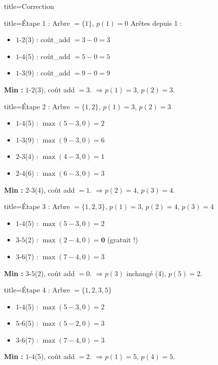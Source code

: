\documentclass[12pt,a4paper]{article}
\begin{document}
\begin{correction}{title=Correction}

\begin{etape}{title=\'Etape 1 : Arbre $= \{1\}$, $p(1)=0$}
Ar\^etes depuis 1 :
\begin{itemize}[nosep]
    \item $1$-$2$(3) : co\^ut\_add $= 3-0 = 3$
    \item $1$-$4$(5) : co\^ut\_add $= 5-0 = 5$
    \item $1$-$3$(9) : co\^ut\_add $= 9-0 = 9$
\end{itemize}
\textbf{Min :} $1$-$2$(3), co\^ut add $= 3$.  $\Rightarrow p(1) = 3$, $p(2) = 3$.
\end{etape}

\begin{etape}{title=\'Etape 2 : Arbre $= \{1,2\}$, $p(1)=3$, $p(2)=3$}
\begin{itemize}[nosep]
    \item $1$-$4$(5) : $\max(5-3,0) = 2$
    \item $1$-$3$(9) : $\max(9-3,0) = 6$
    \item $2$-$3$(4) : $\max(4-3,0) = 1$
    \item $2$-$4$(6) : $\max(6-3,0) = 3$
\end{itemize}
\textbf{Min :} $2$-$3$(4), co\^ut add $= 1$. $\Rightarrow p(2)=4$, $p(3)=4$.
\end{etape}

\begin{etape}{title=\'Etape 3 : Arbre $= \{1,2,3\}$, $p(1)=3$, $p(2)=4$, $p(3)=4$}
\begin{itemize}[nosep]
    \item $1$-$4$(5) : $\max(5-3,0) = 2$
    \item $3$-$5$(2) : $\max(2-4,0) = \mathbf{0}$ \quad (gratuit !)
    \item $3$-$6$(7) : $\max(7-4,0) = 3$
\end{itemize}
\textbf{Min :} $3$-$5$(2), co\^ut add $= 0$. $\Rightarrow p(3)$ inchang\'e (4), $p(5)=2$.
\end{etape}

\begin{etape}{title=\'Etape 4 : Arbre $= \{1,2,3,5\}$}
\begin{itemize}[nosep]
    \item $1$-$4$(5) : $\max(5-3,0) = 2$
    \item $5$-$6$(5) : $\max(5-2,0) = 3$
    \item $3$-$6$(7) : $\max(7-4,0) = 3$
\end{itemize}
\textbf{Min :} $1$-$4$(5), co\^ut add $= 2$. $\Rightarrow p(1)=5$, $p(4)=5$.
\end{etape}


\end{correction}
\end{document}
